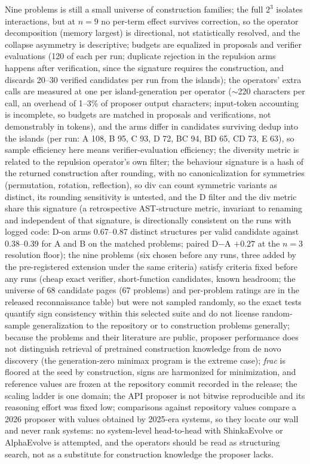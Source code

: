 \documentclass[11pt]{article}
\begin{document}
Nine problems is still a small universe of construction families; the
full $2^3$ isolates interactions, but at $n{=}9$ no per-term effect
survives correction, so the operator decomposition (memory largest) is
directional, not statistically resolved, and the collapse asymmetry is
descriptive;
budgets are equalized in proposals and verifier evaluations (120 of each
per run; duplicate rejection in the repulsion arms happens after
verification, since the signature requires the construction, and discards
20--30 verified candidates per run from the islands); the operators'
extra calls are measured at one per island-generation per operator
($\sim$220 characters per call, an overhead of 1--3\% of proposer
output characters; input-token accounting is incomplete, so budgets are
matched in proposals and verifications, not demonstrably in tokens), and
the arms differ in candidates surviving dedup into the islands (per run:
A 108, B 95, C 93, D 72, BC 94, BD 65, CD 73, E 63), so sample
efficiency here means verifier-evaluation efficiency; the diversity
metric is related to the repulsion operator's own filter; the behaviour
signature is a hash of the returned construction after rounding, with no
canonicalization for symmetries (permutation, rotation, reflection), so
div can count symmetric variants as distinct, its rounding sensitivity is
untested, and the D filter and the div metric share this signature (a
retrospective AST-structure metric, invariant to renaming and
independent of that signature, is directionally consistent on the runs
with logged code: D-on arms 0.67--0.87 distinct structures per valid
candidate against 0.38--0.39 for A and B on the matched problems; paired
D$-$A $+0.27$ at the $n{=}3$ resolution floor); the nine problems (six
chosen before any runs, three added by the pre-registered extension under
the same criteria) satisfy criteria fixed before any runs (cheap exact verifier,
short-function candidates, known headroom; the universe of 68 candidate
pages (67 problems)
and per-problem ratings are in the released reconnaissance table) but were
not sampled randomly, so the exact tests quantify sign consistency
within this selected suite and do not license random-sample
generalization to the repository or to construction problems generally;
because the problems and their literature are public, proposer
performance does not distinguish retrieval of pretrained construction
knowledge from de novo discovery (the generation-zero minimax program is
the extreme case); \emph{frac} is floored at the seed by construction,
signs are harmonized for minimization, and reference values are frozen at
the repository commit recorded in the release; the scaling ladder is one
domain; the API proposer is not bitwise reproducible and its reasoning
effort was fixed low; comparisons against repository values compare a
2026 proposer with values obtained by 2025-era systems, so they locate
our wall and never rank systems: no system-level head-to-head with
ShinkaEvolve or AlphaEvolve is attempted, and the operators should be
read as structuring search, not as a substitute for construction
knowledge the proposer lacks.
\end{document}

